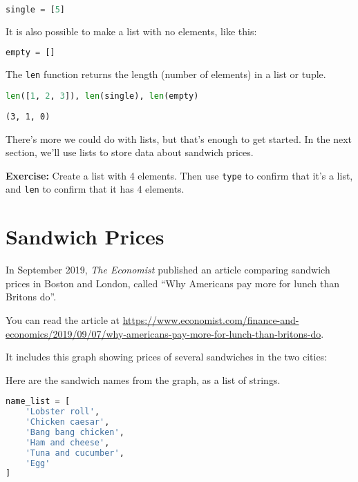 \documentclass[
]{book}
\newcommand{\passthrough}[1]{#1}
\begin{document}
\begin{lstlisting}[language=Python]
single = [5]
\end{lstlisting}

It is also possible to make a list with no elements, like this:

\begin{lstlisting}[language=Python]
empty = []
\end{lstlisting}

The \passthrough{\lstinline!len!} function returns the length (number of
elements) in a list or tuple.

\begin{lstlisting}[language=Python]
len([1, 2, 3]), len(single), len(empty)
\end{lstlisting}

\begin{lstlisting}
(3, 1, 0)
\end{lstlisting}

There's more we could do with lists, but that's enough to get started.
In the next section, we'll use lists to store data about sandwich
prices.

\textbf{Exercise:} Create a list with 4 elements. Then use
\passthrough{\lstinline!type!} to confirm that it's a list, and
\passthrough{\lstinline!len!} to confirm that it has 4 elements.

\section{Sandwich Prices}\label{sandwich-prices}

In September 2019, \emph{The Economist} published an article comparing
sandwich prices in Boston and London, called ``Why Americans pay more
for lunch than Britons do''.

You can read the article at
\url{https://www.economist.com/finance-and-economics/2019/09/07/why-americans-pay-more-for-lunch-than-britons-do}.

It includes this graph showing prices of several sandwiches in the two
cities:

Here are the sandwich names from the graph, as a list of strings.

\begin{lstlisting}[language=Python]
name_list = [
    'Lobster roll',
    'Chicken caesar',
    'Bang bang chicken',
    'Ham and cheese',
    'Tuna and cucumber',
    'Egg'
]
\end{lstlisting}
\end{document}
